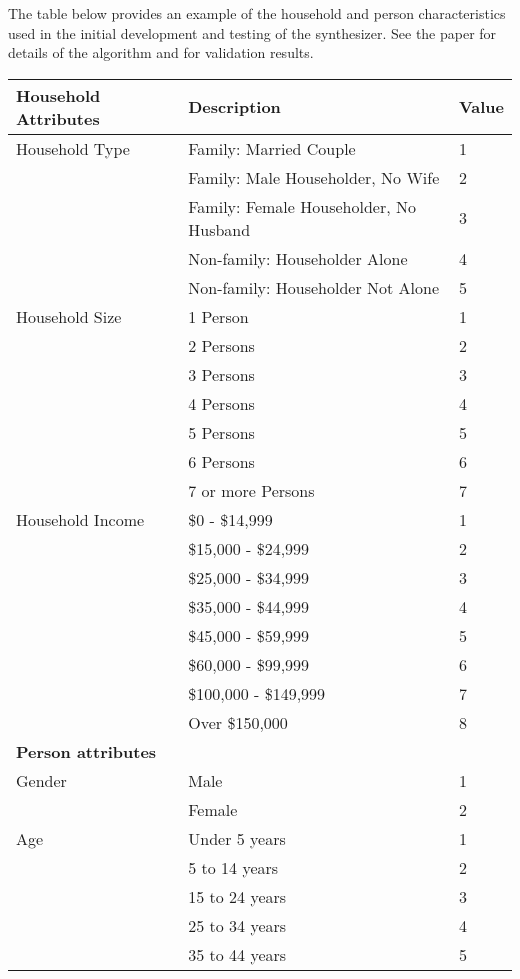 The table below provides an example of the household and person characteristics used in the initial development and testing of the synthesizer.  See the paper for details of the algorithm and for validation results.

\begin{centering}
\begin{tabular}{p{2in}ll}
\textbf{Household Attributes} & \textbf{Description} & \textbf{Value} \\
\hline
Household Type	& Family: Married Couple	& 1\\ %
&	Family: Male Householder, No Wife &	2 \\ %
&	Family: Female Householder, No Husband & 3 \\ %
&	Non-family: Householder Alone	& 4 \\ %
&	Non-family: Householder Not Alone	& 5 \\ \hline
Household Size &	1 Person	& 1 \\ %
&	2 Persons	 & 2\\ %
&	3 Persons	& 3 \\ %
&	4 Persons	& 4 \\ %
&	5 Persons &	5 \\ %
&	6 Persons	& 6  \\ %
&	7 or more Persons & 7 \\ \hline
Household Income	& \$0 - \$14,999 &	1\\ %
&	\$15,000 - \$24,999  &	2\\ %
&	\$25,000 - \$34,999 &	3\\ %
&	\$35,000 - \$44,999 &	4\\ %
&	\$45,000 - \$59,999 &	5\\ %
&	\$60,000 - \$99,999 	& 6\\ %
&	\$100,000 - \$149,999 & 7\\ %
&	Over \$150,000 &	8\\ %
\textbf{Person attributes}		& & \\ \hline
Gender	& Male	& 1\\ %
&	Female	& 2\\ \hline
Age	& Under 5 years	& 1\\ %
&	5 to 14 years	& 2\\ %
&	15 to 24 years	& 3\\ %
&	25 to 34 years	& 4\\ %
&	35 to 44 years	& 5\\ %

\end{tabular}
\end{centering}

